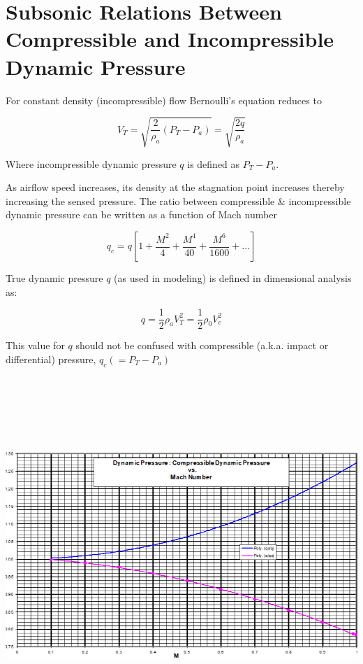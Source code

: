 \documentclass[
]{book}
\begin{document}
\hypertarget{subsonic-relations-between-compressible-and-incompressible-dynamic-pressure}{%
\section{Subsonic Relations Between Compressible and Incompressible Dynamic Pressure}\label{subsonic-relations-between-compressible-and-incompressible-dynamic-pressure}}

For constant density (incompressible) flow Bernoulli's equation reduces to

\[V_T = \sqrt{\frac{2}{\rho_a}(P_T - P_a)} = \sqrt{\frac{2q}{\rho_a}} \]

Where incompressible dynamic pressure \(q\) is defined as \(P_T-P_a\).

As airflow speed increases, its density at the stagnation point increases thereby increasing the sensed pressure. The ratio between compressible \& incompressible dynamic pressure can be written as a function of Mach number

\[q_c = q \left\lbrack 1 + \frac{M^2}{4} + \frac{M^4}{40} + \frac{M^6}{1600} + ... \right\rbrack \]

True dynamic pressure \(q\) (as used in modeling) is defined in dimensional analysis as:

\[q = \frac{1}{2} \rho_a V_T^2 = \frac{1}{2}\rho_0V_e^2\]

This value for \(q\) should not be confused with compressible (a.k.a. impact or differential) pressure, \(q_c (= P_T - P_a)\)

\includegraphics[width=8.99861in,height=5.29097in]{media/04/image8.png}
\end{document}
